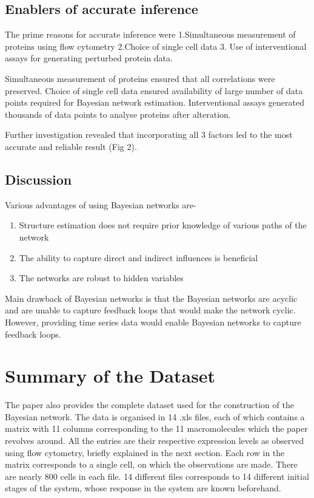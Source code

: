 \documentclass[conference]{IEEEtran}
\begin{document}
\subsection{Enablers of accurate inference}
The prime reasons for accurate inference were 1.Simultaneous measurement of proteins using flow cytometry 2.Choice of single cell data 3. Use of interventional assays for generating perturbed protein data.\par
Simultaneous measurement of proteins ensured that all correlations were preserved. Choice of single cell data ensured availability of large number of data points required for Bayesian network estimation. Interventional assays generated thousands of data points to analyse proteins after alteration.\par
Further investigation revealed that incorporating all 3 factors led to the most accurate and reliable result (Fig 2).

\subsection*{Discussion}
Various advantages of using Bayesian networks are-\par
\begin{enumerate}
    \item Structure estimation does not require prior knowledge of various paths of the network
    \item The ability to capture direct and indirect influences is beneficial
    \item The networks are robust to hidden variables
\end{enumerate}
Main drawback of Bayesian networks is that the Bayesian networks are acyclic and are unable to capture feedback loops that would make the network cyclic. However, providing time series data would enable Bayesian networks to capture feedback loops.


\noindent\makebox[\linewidth]{\rule{\linewidth}{0.4pt}}
\section*{Summary of the Dataset}
The paper also provides the complete dataset used for the construction of the Bayesian network. The data is organised in 14 .xls files, each of which contains a matrix with 11 columns corresponding to the 11 macromolecules which the paper revolves around. All the entries are their respective expression levels as observed using flow cytometry, briefly explained in the next section. Each row in the matrix corresponds to a single cell, on which the observations are made. There are nearly 800 cells in each file. 14 different files corresponds to 14 different initial stages of the system, whose response in the system are known beforehand. 
\end{document}
